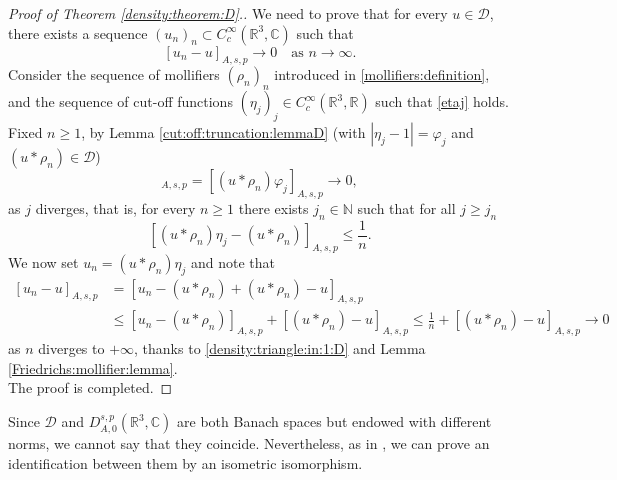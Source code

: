 \documentclass[leqno,11pt]{amsart}
\newcommand{\NN}{\mathbb N}
\newcommand{\R}{\mathbb R}
\newcommand{\CC}{\mathbb C}
\newcommand{\C}{\mathbb C}
\newcommand{\cD}{{\mathcal D}}
\numberwithin{equation}{section}
\begin{document}
\begin{proof}[Proof of Theorem \ref{density:theorem:D}.]
We need to prove that for every $u\in \cD$, there exists a sequence 
$(u_n)_n\subset C^\infty_c(\R^3,\C)$ such that
$$[u_n-u]_{A,s,p}\to 0\quad \text{as} \,\, n\to\infty.$$
Consider the sequence of mollifiers $(\rho_n)_n$ introduced in \eqref{mollifiers:definition}, and the sequence of cut-off functions $(\eta_j)_j \in C^\infty_c(\R^3,\R)$ such that \eqref{etaj} holds.
Fixed $n \geq 1$, by Lemma
\ref{cut:off:truncation:lemmaD} (with $|\eta_j-1|=\varphi_j$ and $(u*\rho_n)\in\cD$)
\begin{equation}
      [(u*\rho_n)\eta_j - (u * \rho_n)]_{A,s,p}
    = 
     [(u*\rho_n)\varphi_j]_{A,s,p} \to 0,
\end{equation}
as $j$ diverges, that is, for every $n \geq 1$ there exists $j_n \in \NN$ such that for all $j\ge j_n$
\begin{equation}
    \label{density:triangle:in:1:D}
    [(u*\rho_n)\eta_j - (u * \rho_n)]_{A,s,p} \leq \frac1n.
\end{equation}
We now set 
   $ u_n=(u*\rho_n)\eta_j$
and note that 
\begin{equation}
\begin{aligned}
    [u_n-u]_{A,s,p}
    &=
    [u_n - (u*\rho_n) + (u*\rho_n) - u]_{A,s,p}\\
    &\leq
    [u_n - (u*\rho_n)]_{A,s,p} + [(u*\rho_n) - u]_{A,s,p}
    \leq
    \frac1n + [(u*\rho_n) - u]_{A,s,p} \to 0
\end{aligned}
\end{equation}
as $n$ diverges to $+\infty$, thanks to \eqref{density:triangle:in:1:D} and Lemma \ref{Friedrichs:mollifier:lemma}.\\
The proof is completed.
\end{proof}


Since $\cD$ and $D^{s,p}_{A,0}(\R^3,\CC)$ are both Banach spaces but endowed with different norms, we cannot say that they coincide. Nevertheless, as in \cite{BrascoGV}, we can prove an identification between them by an isometric isomorphism.
\end{document}

